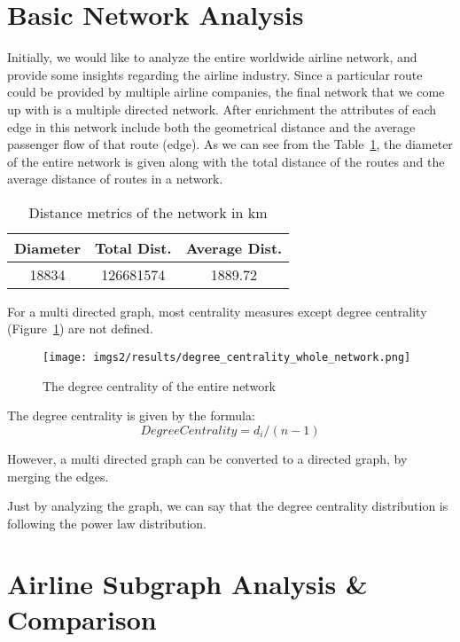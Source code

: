 \documentclass[twocolumn]{tum-article}
\begin{document}
\section{Basic Network Analysis}
Initially, we would like to analyze the entire worldwide airline network, and provide some insights regarding the airline industry.
Since a particular route could be provided by multiple airline companies, the final network that we come up with is a multiple directed network.
After enrichment the attributes of each edge in this network include both the geometrical distance and the average passenger flow of that route (edge). 
As we can see from the Table~\ref{Tab:distance_metrics}, the diameter of the entire network is given along with the total distance of the routes and the average distance of routes in a network.  

\begin{table}[ht]	
\begin{center}
 \begin{tabular}{| c | c | c |}
 \hline
 \textbf{Diameter} & \textbf{Total Dist.} & \textbf{Average Dist.} \\ 
 \hline
 18834 & 126681574 & 1889.72 \\
 \hline
 \end{tabular}
\caption{Distance metrics of the network in km}
\label{Tab:distance_metrics}	 
\end{center}
\end{table}

For a multi directed graph, most centrality measures except degree centrality (Figure~\ref{fig:degree_centrality}) are not defined. 

\begin{figure}
        \centering
        \texttt{[image: imgs2/results/degree\_centrality\_whole\_network.png]}
        \caption{
The degree centrality of the entire network}
        \label{fig:degree_centrality}
\end{figure}

The degree centrality is given by the formula:
\begin{equation}
	Degree Centrality=d_i/(n-1)
\end{equation}

However, a multi directed graph can be converted to a directed graph, by merging the edges. 

Just by analyzing the graph, we can say that the degree centrality distribution is following the power law distribution.

\section{Airline Subgraph Analysis \& Comparison}
\end{document}
